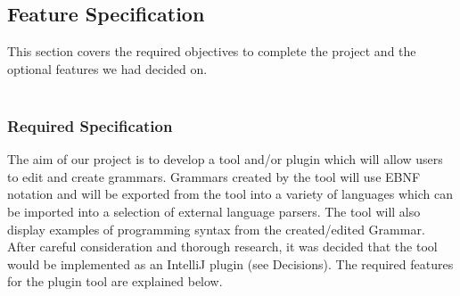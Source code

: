 \subsection{Feature Specification}
This section covers the required objectives to complete the project and the optional features we had decided on. \\
\\
\subsubsection{Required Specification}
The aim of our project is to develop a tool and/or plugin which will allow users to edit and create grammars. Grammars created by the tool will use EBNF notation and will be exported from the tool into a variety of languages which can be imported into a selection of external language parsers. The tool will also display examples of programming syntax from the created/edited Grammar. After careful consideration and thorough research, it was decided that the  tool would be implemented as an IntelliJ plugin (see Decisions). The required features for the plugin tool are explained below. 

